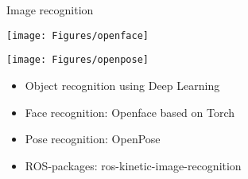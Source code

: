 \documentclass[12pt,a4paper]{article}
\newcommand{\emptylogo}{\texttt{[image: Figures/Empty]}}
\begin{document}
\begin{slidetop}
\begin{multicols}{2}
\begin{bclogo}[couleur = white, arrondi = 0.25, couleurBord = tuedarkblue , barre = none, logo=\emptylogo]{\textcolor{tuedarkblue}{Image recognition}}
\medskip %
\begin{minipage}[T]{0.48\linewidth}
	\begin{center}
		\texttt{[image: Figures/openface]}
	\end{center}
\end{minipage}
\hfill
\begin{minipage}[T]{0.48\linewidth}
    \begin{center}
    	\texttt{[image: Figures/openpose]}
    \end{center}
\end{minipage}
\begin{itemize}[itemsep = 0pt, parsep = 0pt, leftmargin=15pt]
	\item Object recognition using Deep Learning
	\item Face recognition: Openface based on Torch
    \item Pose recognition: OpenPose
    \item ROS-packages: ros-kinetic-image-recognition
\end{itemize}
\end{bclogo}

\vfill
\columnbreak


\end{multicols}
\end{slidetop}
\end{document}
